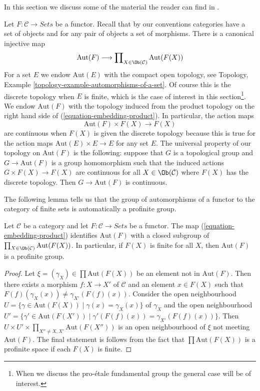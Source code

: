 \noindent
In this section we discuss some of the material the reader can
find in \cite[Expos\'e V, Sections 4, 5, and 6]{SGA1}.

\medskip\noindent
Let $F : \mathcal{C} \to \textit{Sets}$ be a functor.
Recall that by our conventions categories have a set of objects and
for any pair of objects a set of morphisms. There is a canonical
injective map
\begin{equation}
\label{equation-embedding-product}
\text{Aut}(F)
\longrightarrow
\prod\nolimits_{X \in \Ob(\mathcal{C})} \text{Aut}(F(X))
\end{equation}
For a set $E$ we endow $\text{Aut}(E)$ with the compact open topology, see
Topology, Example \ref{topology-example-automorphisms-of-a-set}.
Of course this is the discrete topology when $E$ is finite, which
is the case of interest in this section\footnote{When we discuss the
pro-\'etale fundamental group the general case will be of interest.}.
We endow $\text{Aut}(F)$ with the topology induced from the
product topology on the right hand side of (\ref{equation-embedding-product}).
In particular, the action maps
$$
\text{Aut}(F) \times F(X) \longrightarrow F(X)
$$
are continuous when $F(X)$ is given the discrete topology because this
is true for the action maps $\text{Aut}(E) \times E \to E$ for any set $E$.
The universal property of our topology on $\text{Aut}(F)$ is the following:
suppose that $G$ is a topological group and $G \to \text{Aut}(F)$
is a group homomorphism such that the induced actions $G \times F(X) \to F(X)$
are continuous for all $X \in \Ob(\mathcal{C})$ where $F(X)$ has
the discrete topology. Then $G \to \text{Aut}(F)$ is continuous.

\medskip\noindent
The following lemma tells us that the group of automorphisms of a functor
to the category of finite sets is automatically a profinite group.

\begin{lemma}
\label{lemma-aut-inverse-limit}
Let $\mathcal{C}$ be a category and let $F : \mathcal{C} \to \textit{Sets}$
be a functor. The map (\ref{equation-embedding-product}) identifies
$\text{Aut}(F)$ with a closed subgroup of
$\prod_{X \in \Ob(\mathcal{C})} \text{Aut}(F(X))$.
In particular, if $F(X)$ is finite for all $X$, then
$\text{Aut}(F)$ is a profinite group.
\end{lemma}

\begin{proof}
Let $\xi = (\gamma_X) \in \prod \text{Aut}(F(X))$ be an element not in
$\text{Aut}(F)$. Then there exists a morphism $f : X \to X'$ of $\mathcal{C}$
and an element $x \in F(X)$ such that
$F(f)(\gamma_X(x)) \not = \gamma_{X'}(F(f)(x))$.
Consider the open neighbourhood
$U = \{\gamma \in \text{Aut}(F(X)) \mid \gamma(x) = \gamma_X(x)\}$
of $\gamma_X$ and the open neighbourhood
$U' = \{\gamma' \in \text{Aut}(F(X')) \mid \gamma'(F(f)(x)) =
\gamma_{X'}(F(f)(x))\}$.
Then
$U \times U' \times \prod_{X'' \not = X, X'} \text{Aut}(F(X''))$
is an open neighbourhood of $\xi$ not meeting $\text{Aut}(F)$.
The final statement is follows from the fact that
$\prod \text{Aut}(F(X))$ is a profinite space if each $F(X)$ is finite.
\end{proof}

